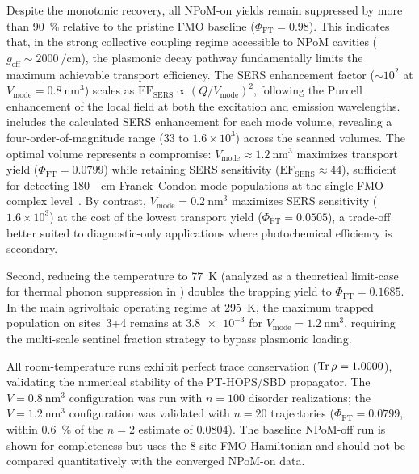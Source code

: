 \documentclass[onecolumn,a4paper,12pt]{article}
\begin{document}
Despite the monotonic recovery, all NPoM-on yields remain suppressed by more than \qty{90}{\percent} relative to the pristine FMO baseline ($\Phi_{\mathrm{FT}} = 0.98$).
This indicates that, in the strong collective coupling regime accessible to NPoM cavities ($g_{\mathrm{eff}} \sim \qty{2000}{\per\cm}$), the plasmonic decay pathway fundamentally limits the maximum achievable transport efficiency.
The SERS enhancement factor ($\sim 10^2$ at $V_{\mathrm{mode}} = \qty{0.8}{\nm\cubed}$) scales as $\mathrm{EF}_{\mathrm{SERS}} \propto (Q/V_{\mathrm{mode}})^2$, following the Purcell enhancement of the local field at both the excitation and emission wavelengths.
 includes the calculated SERS enhancement for each mode volume, revealing a four-order-of-magnitude range ($33$ to $1.6\times10^3$) across the scanned volumes. The optimal volume represents a compromise: $V_{\mathrm{mode}} \approx \qty{1.2}{\nm\cubed}$ maximizes transport yield ($\Phi_{\mathrm{FT}} = 0.0799$) while retaining SERS sensitivity ($\mathrm{EF}_{\mathrm{SERS}} \approx 44$), sufficient for detecting \qty{180}{\per\cm} Franck--Condon mode populations at the single-FMO-complex level~\cite{CiallaMay2024}.
By contrast, $V_{\mathrm{mode}} = \qty{0.2}{\nm\cubed}$ maximizes SERS sensitivity ($1.6\times10^3$) at the cost of the lowest transport yield ($\Phi_{\mathrm{FT}} = 0.0505$), a trade-off better suited to diagnostic-only applications where photochemical efficiency is secondary.

Second, reducing the temperature to \qty{77}{\kelvin} (analyzed as a theoretical limit-case for thermal phonon suppression in ) doubles the trapping yield to $\Phi_{\mathrm{FT}} = 0.1685$. In the main agrivoltaic operating regime at \qty{295}{\kelvin}, the maximum trapped population on sites~3+4 remains at $\num{3.8e-3}$ for $V_{\mathrm{mode}} = \qty{1.2}{\nm\cubed}$, requiring the multi-scale sentinel fraction strategy to bypass plasmonic loading.

All room-temperature runs exhibit perfect trace conservation ($\Tr\rho = \num{1.0000 \pm 0.0000}$), validating the numerical stability of the PT-HOPS/SBD propagator. The $V=\qty{0.8}{\nm\cubed}$ configuration was run with $n=100$ disorder realizations; the $V=\qty{1.2}{\nm\cubed}$ configuration was validated with $n=20$ trajectories ($\Phi_{\mathrm{FT}} = 0.0799$, within \qty{0.6}{\percent} of the $n=2$ estimate of $0.0804$). The baseline NPoM-off run is shown for completeness but uses the 8-site FMO Hamiltonian and should not be compared quantitatively with the converged NPoM-on data.
\end{document}
